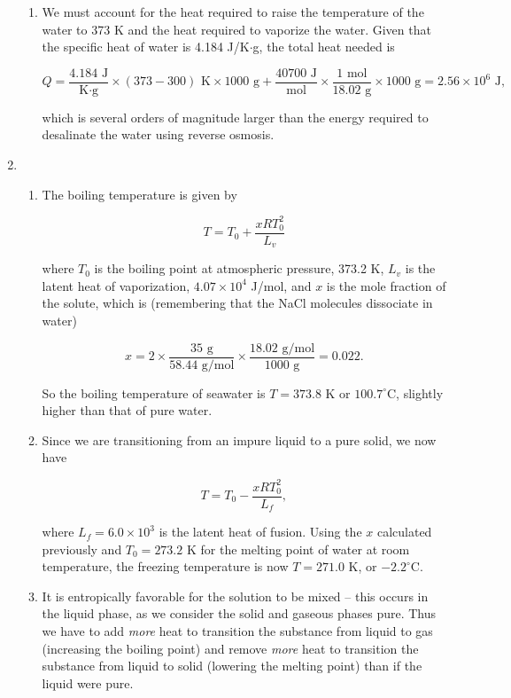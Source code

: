 \documentclass{article}
\begin{document}
\begin{enumerate}
\begin{enumerate}
		\item

		We must account for the heat required to raise the temperature of the water to 373 K and the heat required to vaporize the water. Given that the specific heat of water is 4.184 J/K$\cdot$g, the total heat needed is

		$$Q = \frac{4.184 \text{ J}}{\text{K} \cdot \text{g}} \times (373 - 300) \text{ K} \times 1000 \text{ g} + \frac{40700 \text{ J}}{\text{mol}} \times \frac{1 \text{ mol}}{18.02 \text{ g}} \times 1000 \text{ g} = 2.56 \times 10^6 \text{ J},$$

		which is several orders of magnitude larger than the energy required to desalinate the water using reverse osmosis.

	\end{enumerate}

	\item

	\begin{enumerate}

		\item

		The boiling temperature is given by

		$$T = T_0 + \frac{x R T_0^2}{L_v}$$

		where $T_0$ is the boiling point at atmospheric pressure, 373.2 K, $L_v$ is the latent heat of vaporization, $4.07 \times 10^4$ J/mol, and $x$ is the mole fraction of the solute, which is (remembering that the NaCl molecules dissociate in water)

		$$x = 2 \times \frac{35 \text{ g}}{58.44 \text{ g/mol}} \times \frac{18.02 \text{ g/mol}}{1000 \text{ g}} = 0.022.$$

		So the boiling temperature of seawater is $T = 373.8$ K or $100.7^\circ$C, slightly higher than that of pure water.

		\item

		Since we are transitioning from an impure liquid to a pure solid, we now have

		$$T = T_0 - \frac{x R T_0^2}{L_f},$$

		where $L_f = 6.0 \times 10^3$ is the latent heat of fusion. Using the $x$ calculated previously and $T_0 = 273.2$ K for the melting point of water at room temperature, the freezing temperature is now $T = 271.0$ K, or $-2.2^\circ$C. 

		\item

		It is entropically favorable for the solution to be mixed -- this occurs in the liquid phase, as we consider the solid and gaseous phases pure. Thus we have to add \textit{more} heat to transition the substance from liquid to gas (increasing the boiling point) and remove \textit{more} heat to transition the substance from liquid to solid (lowering the melting point) than if the liquid were pure.


\end{enumerate}
\end{enumerate}
\end{document}
